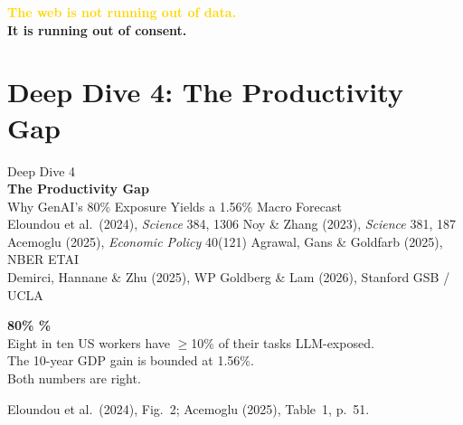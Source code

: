 \documentclass[aspectratio=169,11pt]{beamer}
\begin{document}
{
\begin{frame}[plain]
\vfill
\begin{center}
{\huge\bfseries\textcolor{Gold}{The web is not running out of data.}}\\[0.8cm]
{\huge\bfseries\textcolor{SoftWhite}{It is running out of \alert{consent}.}}
\end{center}
\vfill
\end{frame}}


\section{Deep Dive 4: The Productivity Gap}

{
\begin{frame}[plain]
\vfill
\begin{center}
{\large\textcolor{WarmGray}{Deep Dive 4}}\\[0.4cm]
{\Huge\bfseries\textcolor{DeepNavy}{The Productivity Gap}}\\[0.3cm]
{\large\textcolor{WarmGray}{Why GenAI's 80\% Exposure Yields a 1.56\% Macro Forecast}}\\[1.0cm]
\footnotesize\textcolor{WarmGray}{%
Eloundou et al.\ (2024), \emph{Science} 384, 1306 \quad\textbar\quad
Noy \& Zhang (2023), \emph{Science} 381, 187\\
Acemoglu (2025), \emph{Economic Policy} 40(121) \quad\textbar\quad
Agrawal, Gans \& Goldfarb (2025), NBER ETAI\\
Demirci, Hannane \& Zhu (2025), WP \quad\textbar\quad
Goldberg \& Lam (2026), Stanford GSB / UCLA}
\end{center}
\vfill
\end{frame}}

\begin{frame}[plain]
\vfill
\begin{center}
{\Huge\bfseries\textcolor{DeepRed}{80\% \quad\textemdash{}\%}}\\[0.6cm]
{\Large\textcolor{DeepNavy}{Eight in ten US workers have $\geq$10\% of their tasks LLM-exposed.}}\\[0.2cm]
{\Large\textcolor{DeepNavy}{The 10-year GDP gain is bounded at \alert{1.56\%}.}}\\[0.2cm]
{\Large\textcolor{DeepNavy}{Both numbers are right.}}
\end{center}
\vfill
\begin{flushright}
\scriptsize\textcolor{WarmGray}{Eloundou et al.\ (2024), Fig.~2; Acemoglu (2025), Table~1, p.~51.}
\end{flushright}
\end{frame}
\end{document}
